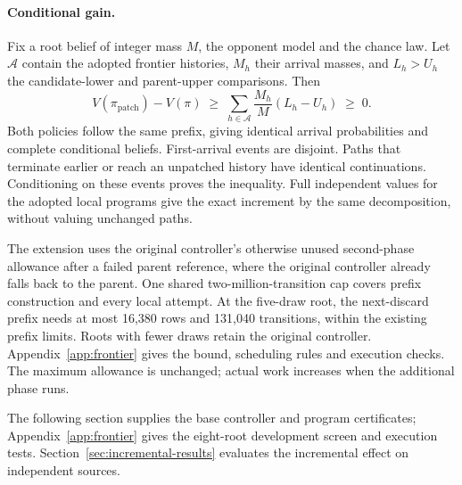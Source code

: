 

\paragraph{Conditional gain.}
Fix a root belief of integer mass $M$, the opponent model and the chance law.
Let $\mathcal A$ contain the adopted frontier histories, $M_h$ their arrival
masses, and $L_h>U_h$ the candidate-lower and parent-upper comparisons. Then
\begin{equation}
 V(\pi_{\mathrm{patch}})-V(\pi)
 \;\geq\;
 \sum_{h\in\mathcal A}\frac{M_h}{M}(L_h-U_h)\;\geq\;0.
 \label{eq:frontier-gain}
\end{equation}
Both policies follow the same prefix, giving identical arrival probabilities
and complete conditional beliefs. First-arrival events are disjoint. Paths
that terminate earlier or reach an unpatched history have identical
continuations. Conditioning on these events proves the inequality. Full
independent values for the adopted local programs give the exact increment
by the same decomposition, without valuing unchanged paths.

The extension uses the original controller's otherwise unused second-phase
allowance after a failed parent reference, where the original controller
already falls back to the parent. One shared two-million-transition
cap covers prefix construction and every local attempt. At the five-draw root,
the next-discard prefix needs at most 16,380 rows and 131,040 transitions,
within the existing prefix limits. Roots with fewer draws retain the original
controller. Appendix~\ref{app:frontier} gives the bound, scheduling rules and
execution checks. The maximum allowance is unchanged; actual work increases
when the additional phase runs.

The following section supplies the base controller and program certificates;
Appendix~\ref{app:frontier} gives the eight-root development screen and execution
tests. Section~\ref{sec:incremental-results} evaluates the incremental effect
on independent sources.
